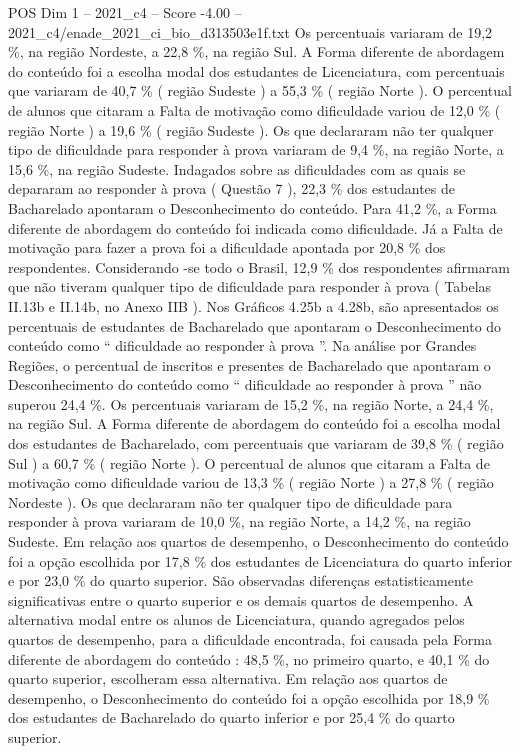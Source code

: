 \begin{textsample}{POS Dim 1 – 2021\_c4 – Score -4.00 – 2021\_c4/enade\_2021\_ci\_bio\_d313503e1f.txt}
Os percentuais variaram de 19,2 \%, na região Nordeste, a 22,8 \%, na região Sul.
A Forma diferente de abordagem do conteúdo foi a escolha modal dos estudantes de Licenciatura, com percentuais que variaram de 40,7 \% ( região Sudeste ) a 55,3 \% ( região Norte ).
O percentual de alunos que citaram a Falta de motivação como dificuldade variou de 12,0 \% ( região Norte ) a 19,6 \% ( região Sudeste ).
Os que declararam não ter qualquer tipo de dificuldade para responder à prova variaram de 9,4 \%, na região Norte, a 15,6 \%, na região Sudeste.
Indagados sobre as dificuldades com as quais se depararam ao responder à prova ( Questão 7 ), 22,3 \% dos estudantes de Bacharelado apontaram o Desconhecimento do conteúdo.
Para 41,2 \%, a Forma diferente de abordagem do conteúdo foi indicada como dificuldade.
Já a Falta de motivação para fazer a prova foi a dificuldade apontada por 20,8 \% dos respondentes.
Considerando -se todo o Brasil, 12,9 \% dos respondentes afirmaram que não tiveram qualquer tipo de dificuldade para responder à prova ( Tabelas II.13b e II.14b, no Anexo IIB ).
Nos Gráficos 4.25b a 4.28b, são apresentados os percentuais de estudantes de Bacharelado que apontaram o Desconhecimento do conteúdo como “ dificuldade ao responder à prova ”.
Na análise por Grandes Regiões, o percentual de inscritos e presentes de Bacharelado que apontaram o Desconhecimento do conteúdo como “ dificuldade ao responder à prova ” não superou 24,4 \%.
Os percentuais variaram de 15,2 \%, na região Norte, a 24,4 \%, na região Sul.
A Forma diferente de abordagem do conteúdo foi a escolha modal dos estudantes de Bacharelado, com percentuais que variaram de 39,8 \% ( região Sul ) a 60,7 \% ( região Norte ).
O percentual de alunos que citaram a Falta de motivação como dificuldade variou de 13,3 \% ( região Norte ) a 27,8 \% ( região Nordeste ).
Os que declararam não ter qualquer tipo de dificuldade para responder à prova variaram de 10,0 \%, na região Norte, a 14,2 \%, na região Sudeste.
Em relação aos quartos de desempenho, o Desconhecimento do conteúdo foi a opção escolhida por 17,8 \% dos estudantes de Licenciatura do quarto inferior e por 23,0 \% do quarto superior.
São observadas diferenças estatisticamente significativas entre o quarto superior e os demais quartos de desempenho.
A alternativa modal entre os alunos de Licenciatura, quando agregados pelos quartos de desempenho, para a dificuldade encontrada, foi causada pela Forma diferente de abordagem do conteúdo : 48,5 \%, no primeiro quarto, e 40,1 \% do quarto superior, escolheram essa alternativa.
Em relação aos quartos de desempenho, o Desconhecimento do conteúdo foi a opção escolhida por 18,9 \% dos estudantes de Bacharelado do quarto inferior e por 25,4 \% do quarto superior.

\end{textsample}

